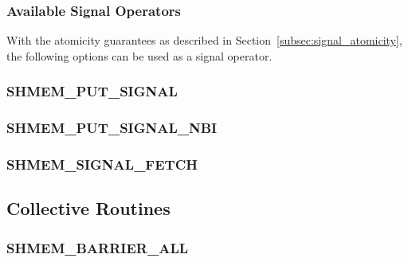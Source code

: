 \documentclass[10pt]{book}
\begin{document}
\subsubsection{Available Signal Operators}
\label{subsec:signal_operator}

With the atomicity guarantees as described in
Section~\ref{subsec:signal_atomicity}, the following options can be used as a
signal operator.




\subsubsection{\textbf{SHMEM\_PUT\_SIGNAL}}\label{subsec:shmem_put_signal}


\subsubsection{\textbf{SHMEM\_PUT\_SIGNAL\_NBI}}\label{subsec:shmem_put_signal_nbi}


\subsubsection{\textbf{SHMEM\_SIGNAL\_FETCH}}\label{subsec:shmem_signal_fetch}




\subsection{Collective Routines}\label{subsec:coll}


\subsubsection{\textbf{SHMEM\_BARRIER\_ALL}}\label{subsec:shmem_barrier_all}

\end{document}
